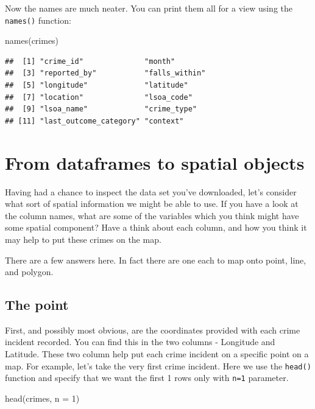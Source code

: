 \documentclass[
  krantz2]{krantz}
\makeatletter
\newenvironment{Shaded}{\begin{snugshade}}{\end{snugshade}}
\newcommand{\AttributeTok}[1]{\textcolor[rgb]{0.61,0.61,0.61}{#1}}
\newcommand{\DecValTok}[1]{\textcolor[rgb]{0.06,0.06,0.06}{#1}}
\newcommand{\FunctionTok}[1]{\textcolor[rgb]{0,0,0}{#1}}
\newcommand{\NormalTok}[1]{#1}
\newenvironment{kframe}{%
\medskip{}
\setlength{\fboxsep}{.8em}
 \def\at@end@of@kframe{}%
 \ifinner\ifhmode%
  \def\at@end@of@kframe{\end{minipage}}%
  \begin{minipage}{\columnwidth}%
 \fi\fi%
 \def\FrameCommand##1{\hskip\@totalleftmargin \hskip-\fboxsep
 \colorbox{shadecolor}{##1}\hskip-\fboxsep
     \hskip-\linewidth \hskip-\@totalleftmargin \hskip\columnwidth}%
 \MakeFramed {\advance\hsize-\width
   \@totalleftmargin\z@ \linewidth\hsize
   \@setminipage}}%
 {\par\unskip\endMakeFramed%
 \at@end@of@kframe}
\renewenvironment{Shaded}{\begin{kframe}}{\end{kframe}}
\makeatother
\begin{document}
Now the names are much neater. You can print them all for a view using the \texttt{names()} function:

\begin{Shaded}
\begin{Highlighting}[]
\FunctionTok{names}\NormalTok{(crimes)}
\end{Highlighting}
\end{Shaded}

\begin{verbatim}
##  [1] "crime_id"              "month"                
##  [3] "reported_by"           "falls_within"         
##  [5] "longitude"             "latitude"             
##  [7] "location"              "lsoa_code"            
##  [9] "lsoa_name"             "crime_type"           
## [11] "last_outcome_category" "context"
\end{verbatim}

\hypertarget{from-dataframes-to-spatial-objects}{%
\section{From dataframes to spatial objects}\label{from-dataframes-to-spatial-objects}}

Having had a chance to inspect the data set you've downloaded, let's consider what sort of spatial information we might be able to use. If you have a look at the column names, what are some of the variables which you think might have some spatial component? Have a think about each column, and how you think it may help to put these crimes on the map.

There are a few answers here. In fact there are one each to map onto point, line, and polygon.

\hypertarget{the-point}{%
\subsection{The point}\label{the-point}}

First, and possibly most obvious, are the coordinates provided with each crime incident recorded. You can find this in the two columns - Longitude and Latitude. These two column help put each crime incident on a specific point on a map. For example, let's take the very first crime incident. Here we use the \texttt{head()} function and specify that we want the first 1 rows only with \texttt{n=1} parameter.

\begin{Shaded}
\begin{Highlighting}[]
\FunctionTok{head}\NormalTok{(crimes, }\AttributeTok{n =} \DecValTok{1}\NormalTok{)}
\end{Highlighting}
\end{Shaded}
\end{document}
